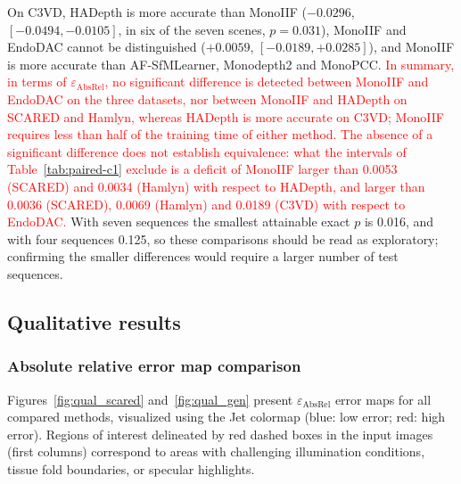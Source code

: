 \documentclass[a4paper,fleqn]{cas-dc}
\begin{document}
{On C3VD, HADepth is more accurate than MonoIIF ($-0.0296$, $[-0.0494, -0.0105]$, in six of the seven scenes, $p=0.031$), MonoIIF and EndoDAC cannot be distinguished ($+0.0059$, $[-0.0189, +0.0285]$), and MonoIIF is more accurate than AF-SfMLearner, Monodepth2 and MonoPCC.
\textcolor{red}{In summary, in terms of $\varepsilon_\textrm{AbsRel}$, no significant difference is detected between MonoIIF and EndoDAC on the three datasets, nor between MonoIIF and HADepth on SCARED and Hamlyn, whereas HADepth is more accurate on C3VD; MonoIIF requires less than half of the training time of either method. The absence of a significant difference does not establish equivalence: what the intervals of Table~\ref{tab:paired-c1} exclude is a deficit of MonoIIF larger than 0.0053 (SCARED) and 0.0034 (Hamlyn) with respect to HADepth, and larger than 0.0036 (SCARED), 0.0069 (Hamlyn) and 0.0189 (C3VD) with respect to EndoDAC.} With seven sequences the smallest attainable exact $p$ is 0.016, and with four sequences 0.125, so these comparisons should be read as exploratory; confirming the smaller differences would require a larger number of test sequences.
}
%
\subsection{Qualitative results}
\subsubsection{Absolute relative error map comparison}

Figures~\ref{fig:qual_scared} and~\ref{fig:qual_gen} present $\varepsilon_{\text{AbsRel}}$ error maps for 
all compared methods, visualized using the Jet colormap (blue: low error; red: high error). Regions of interest delineated by red dashed boxes in the input images (first columns) correspond to areas with challenging illumination conditions, tissue fold boundaries, or specular highlights.
\end{document}
